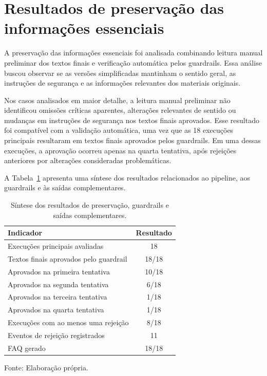 \section{Resultados de preservação das informações essenciais}
\label{sec:resultados-preservacao-informacoes-essenciais}

A preservação das informações essenciais foi analisada combinando leitura manual preliminar dos textos finais e verificação automática pelos guardrails. Essa análise buscou observar se as versões simplificadas mantinham o sentido geral, as instruções de segurança e as informações relevantes dos materiais originais.

Nos casos analisados em maior detalhe, a leitura manual preliminar não identificou omissões críticas aparentes, alterações relevantes de sentido ou mudanças em instruções de segurança nos textos finais aprovados. Esse resultado foi compatível com a validação automática, uma vez que as 18 execuções principais resultaram em textos finais aprovados pelos guardrails. Em uma dessas execuções, a aprovação ocorreu apenas na quarta tentativa, após rejeições anteriores por alterações consideradas problemáticas.

A Tabela~\ref{tab:preservacao-guardrails-saidas} apresenta uma síntese dos resultados relacionados ao pipeline, aos guardrails e às saídas complementares.

\begin{table}[htbp]
  \centering
  \caption{Síntese dos resultados de preservação, guardrails e saídas complementares.}
  \label{tab:preservacao-guardrails-saidas}
  \small
  \begin{tabularx}{\textwidth}{Xc}
    \toprule
    \textbf{Indicador} & \textbf{Resultado} \\
    \midrule
    Execuções principais avaliadas & 18 \\
    Textos finais aprovados pelo guardrail & 18/18 \\
    Aprovados na primeira tentativa & 10/18 \\
    Aprovados na segunda tentativa & 6/18 \\
    Aprovados na terceira tentativa & 1/18 \\
    Aprovados na quarta tentativa & 1/18 \\
    Execuções com ao menos uma rejeição & 8/18 \\
    Eventos de rejeição registrados & 11 \\
    FAQ gerado & 18/18 \\
    \bottomrule
  \end{tabularx}

  {\footnotesize Fonte: Elaboração própria.}
\end{table}

